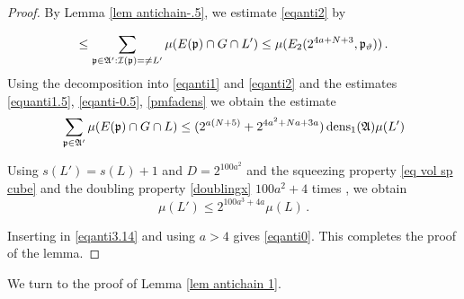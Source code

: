 \begin{proof}
  By Lemma \ref{lem antichain-.5}, we estimate \eqref{eqanti2} by

  \begin{equation}\label{eqanti0.5}
    \le \sum_{\mathfrak p\in\mathfrak{A}':\mathcal{I}(\mathfrak p)=\neq L'}\mu(E(\mathfrak p)\cap G\cap L')
    \le  \mu (E_2(2^{4a+N+3},\mathfrak p_\vartheta))
 \, .
\end{equation}
Using the decomposition
into \eqref{eqanti1} and
\eqref{eqanti2} and the estimates
\eqref{equanti1.5},
\eqref{eqanti-0.5},
\eqref{pmfadens} we obtain the estimate
\begin{equation}\label{eqanti3.14}
\sum_{\mathfrak p\in\mathfrak{A}'}\mu(E(\mathfrak p)\cap G \cap L)
    \le (2^{a(N+5)}+2^{4a^2+Na+3a})\operatorname{\operatorname{dens}}_1(\mathfrak{A})\mu(L')
\end{equation}



  Using $s(L')=s(L)+1$ and $D=2^{100a^2}$ and the
squeezing property \eqref{eq vol sp cube}
and the doubling property \eqref{doublingx} $100a^2+4$ times , we obtain
\begin{equation}
    \mu(L')\le 2^{100a^3+4a}\mu(L)\, .
\end{equation}


Inserting in \eqref{eqanti3.14} and using $a>4$ gives \eqref{eqanti0}.
This completes the proof of the lemma.







\end{proof}



We turn to the proof of Lemma \ref{lem antichain 1}.





